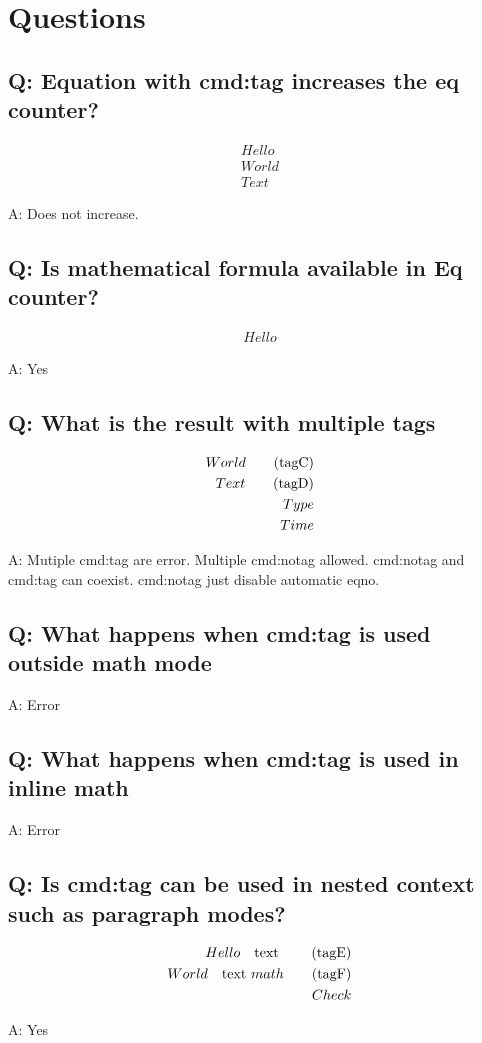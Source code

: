 \documentclass[11pt]{revtex4-1}
\begin{document}
\section{Questions}
\subsection*{Q: Equation with cmd:tag increases the eq counter?}

\begin{align}
  Hello \\
  World \tag{hello} \\
  Text
\end{align}

A: Does not increase.

\subsection*{Q: Is mathematical formula available in Eq counter?}
\begin{align}
  Hello \tag{$\frac12$}
\end{align}

A: Yes

\subsection*{Q: What is the result with multiple tags}
\begin{align}
  World \notag \tag{tagC} \\
  Text \tag{tagD} \notag \\
  Type \notag \notag \\
  Time
\end{align}

A: Mutiple cmd:tag are error. Multiple cmd:notag allowed. cmd:notag and cmd:tag can coexist. cmd:notag just disable automatic eqno.

\subsection*{Q: What happens when cmd:tag is used outside math mode}


A: Error

\subsection*{Q: What happens when cmd:tag is used in inline math}


A: Error

\subsection*{Q: Is cmd:tag can be used in nested context such as paragraph modes?}
\begin{align}
  Hello \quad\text{text \tag{tagE}} \\
  World \quad\text{text $math\tag{tagF}$} \\
  Check
\end{align}

A: Yes
\end{document}
